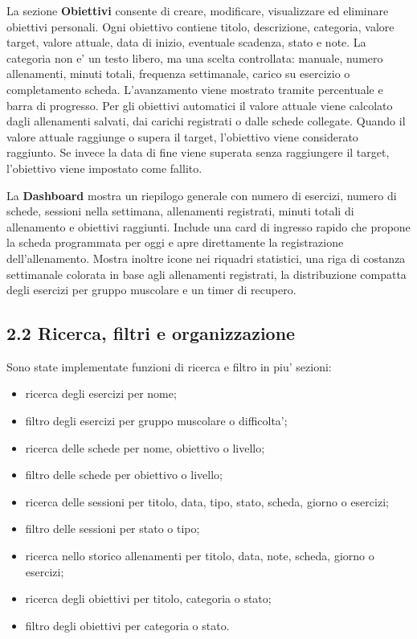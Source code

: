 \documentclass[11pt,a4paper]{article}
\begin{document}
La sezione \textbf{Obiettivi} consente di creare, modificare, visualizzare ed eliminare obiettivi personali. Ogni obiettivo contiene titolo, descrizione, categoria, valore target, valore attuale, data di inizio, eventuale scadenza, stato e note. La categoria non e' un testo libero, ma una scelta controllata: manuale, numero allenamenti, minuti totali, frequenza settimanale, carico su esercizio o completamento scheda. L'avanzamento viene mostrato tramite percentuale e barra di progresso. Per gli obiettivi automatici il valore attuale viene calcolato dagli allenamenti salvati, dai carichi registrati o dalle schede collegate. Quando il valore attuale raggiunge o supera il target, l'obiettivo viene considerato raggiunto. Se invece la data di fine viene superata senza raggiungere il target, l'obiettivo viene impostato come fallito.

La \textbf{Dashboard} mostra un riepilogo generale con numero di esercizi, numero di schede, sessioni nella settimana, allenamenti registrati, minuti totali di allenamento e obiettivi raggiunti. Include una card di ingresso rapido che propone la scheda programmata per oggi e apre direttamente la registrazione dell'allenamento. Mostra inoltre icone nei riquadri statistici, una riga di costanza settimanale colorata in base agli allenamenti registrati, la distribuzione compatta degli esercizi per gruppo muscolare e un timer di recupero.

\subsection{2.2 Ricerca, filtri e organizzazione}

Sono state implementate funzioni di ricerca e filtro in piu' sezioni:

\begin{itemize}
  \item ricerca degli esercizi per nome;
  \item filtro degli esercizi per gruppo muscolare o difficolta';
  \item ricerca delle schede per nome, obiettivo o livello;
  \item filtro delle schede per obiettivo o livello;
  \item ricerca delle sessioni per titolo, data, tipo, stato, scheda, giorno o esercizi;
  \item filtro delle sessioni per stato o tipo;
  \item ricerca nello storico allenamenti per titolo, data, note, scheda, giorno o esercizi;
  \item ricerca degli obiettivi per titolo, categoria o stato;
  \item filtro degli obiettivi per categoria o stato.
\end{itemize}
\end{document}
